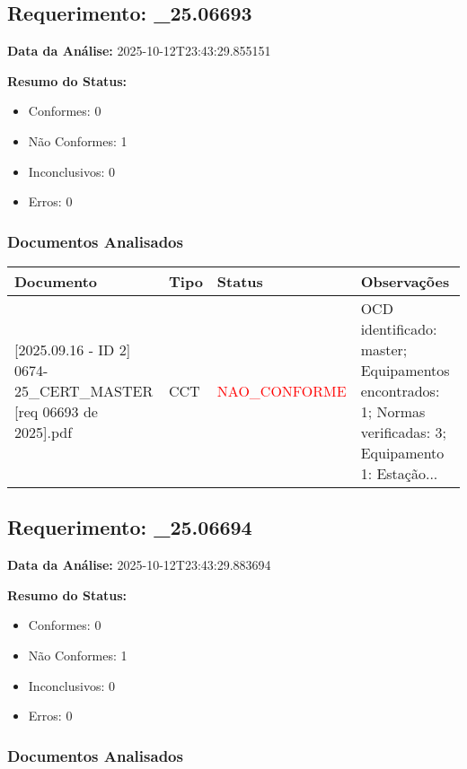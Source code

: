 \documentclass[12pt,a4paper]{article}
\begin{document}
\subsection{Requerimento: \_25.06693}

\textbf{Data da Análise:} 2025-10-12T23:43:29.855151

\textbf{Resumo do Status:}
\begin{itemize}
    \item Conformes: 0
    \item Não Conformes: 1
    \item Inconclusivos: 0
    \item Erros: 0
\end{itemize}

\subsubsection{Documentos Analisados}

\begin{longtable}{|p{4cm}|p{2cm}|p{2cm}|p{6cm}|}
\hline
\textbf{Documento} & \textbf{Tipo} & \textbf{Status} & \textbf{Observações} \\
\hline
\endhead
[Certificado de Conformidade Técnica - CCT][2025.09.16 - ID 2] 0674-25\_CERT\_MASTER [req 06693 de 2025].pdf & CCT & \textcolor{red}{NAO\_CONFORME} & OCD identificado: master; Equipamentos encontrados: 1; Normas verificadas: 3; Equipamento 1: Estação... \\
\hline
\end{longtable}


\subsection{Requerimento: \_25.06694}

\textbf{Data da Análise:} 2025-10-12T23:43:29.883694

\textbf{Resumo do Status:}
\begin{itemize}
    \item Conformes: 0
    \item Não Conformes: 1
    \item Inconclusivos: 0
    \item Erros: 0
\end{itemize}

\subsubsection{Documentos Analisados}
\end{document}
